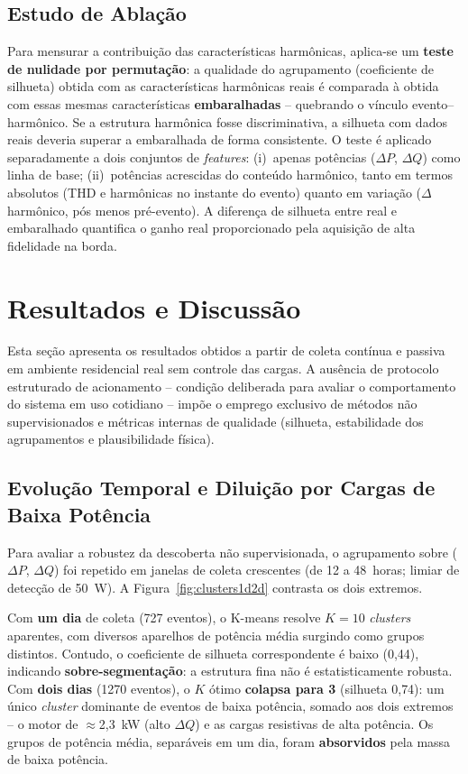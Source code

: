 \documentclass[12pt]{article}
\begin{document}
\subsection{Estudo de Abla\c{c}\~ao}

Para mensurar a contribui\c{c}\~ao das caracter\'isticas harm\^onicas, aplica-se
um \textbf{teste de nulidade por permuta\c{c}\~ao}: a qualidade do agrupamento
(coeficiente de silhueta) obtida com as caracter\'isticas harm\^onicas reais \'e
comparada \`a obtida com essas mesmas caracter\'isticas \textbf{embaralhadas} --
quebrando o v\'inculo evento--harm\^onico. Se a estrutura harm\^onica fosse
discriminativa, a silhueta com dados reais deveria superar a embaralhada de forma
consistente. O teste \'e aplicado separadamente a dois conjuntos de
\textit{features}: (i)~apenas pot\^encias ($\Delta P$, $\Delta Q$) como linha de
base; (ii)~pot\^encias acrescidas do conte\'udo harm\^onico, tanto em termos
absolutos (THD e harm\^onicas no instante do evento) quanto em varia\c{c}\~ao
($\Delta$harm\^onico, p\'os menos pr\'e-evento). A diferen\c{c}a de silhueta entre
real e embaralhado quantifica o ganho real proporcionado pela aquisi\c{c}\~ao de
alta fidelidade na borda.


\section{Resultados e Discuss\~ao}

Esta se\c{c}\~ao apresenta os resultados obtidos a partir de coleta cont\'inua e
passiva em ambiente residencial real sem controle das cargas. A aus\^encia de
protocolo estruturado de acionamento -- condi\c{c}\~ao deliberada para avaliar o
comportamento do sistema em uso cotidiano -- imp\~oe o emprego exclusivo de
m\'etodos n\~ao supervisionados e m\'etricas internas de qualidade (silhueta,
estabilidade dos agrupamentos e plausibilidade f\'isica).

\subsection{Evolu\c{c}\~ao Temporal e Dilui\c{c}\~ao por Cargas de Baixa
Pot\^encia}

Para avaliar a robustez da descoberta n\~ao supervisionada, o agrupamento sobre
($\Delta P$, $\Delta Q$) foi repetido em janelas de coleta crescentes (de 12 a
48~horas; limiar de detec\c{c}\~ao de 50~W). A Figura~\ref{fig:clusters1d2d}
contrasta os dois extremos.

Com \textbf{um dia} de coleta (727 eventos), o K-means resolve $K=10$
\textit{clusters} aparentes, com diversos aparelhos de pot\^encia m\'edia surgindo
como grupos distintos. Contudo, o coeficiente de silhueta correspondente \'e baixo
(0{,}44), indicando \textbf{sobre-segmenta\c{c}\~ao}: a estrutura fina n\~ao \'e
estatisticamente robusta. Com \textbf{dois dias} (1270 eventos), o $K$ \'otimo
\textbf{colapsa para 3} (silhueta 0{,}74): um \'unico \textit{cluster} dominante de
eventos de baixa pot\^encia, somado aos dois extremos -- o motor de
$\approx$2{,}3~kW (alto $\Delta Q$) e as cargas resistivas de alta pot\^encia. Os
grupos de pot\^encia m\'edia, separ\'aveis em um dia, foram \textbf{absorvidos}
pela massa de baixa pot\^encia.
\end{document}
